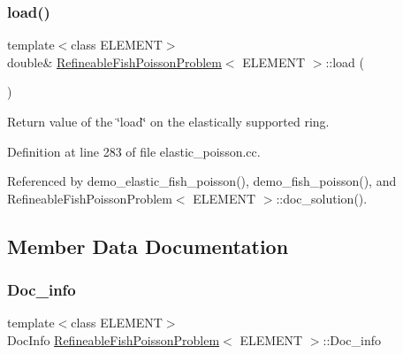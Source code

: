 \mbox{\label{classRefineableFishPoissonProblem_a20702e8945d442c9597348b550da14e4}} 
\subsubsection{\texorpdfstring{load()}{load()}}
{\footnotesize\ttfamily template$<$class E\+L\+E\+M\+E\+NT$>$ \\
double\& \hyperlink{classRefineableFishPoissonProblem}{Refineable\+Fish\+Poisson\+Problem}$<$ E\+L\+E\+M\+E\+NT $>$\+::load (\begin{DoxyParamCaption}{ }\end{DoxyParamCaption})\hspace{0.3cm}{\ttfamily [inline]}}



Return value of the \char`\"{}load\char`\"{} on the elastically supported ring. 



Definition at line 283 of file elastic\+\_\+poisson.\+cc.



Referenced by demo\+\_\+elastic\+\_\+fish\+\_\+poisson(), demo\+\_\+fish\+\_\+poisson(), and Refineable\+Fish\+Poisson\+Problem$<$ E\+L\+E\+M\+E\+N\+T $>$\+::doc\+\_\+solution().



\subsection{Member Data Documentation}
\mbox{\label{classRefineableFishPoissonProblem_ad6d382f1d38425323627f34e0559b28f}} 
\subsubsection{\texorpdfstring{Doc\+\_\+info}{Doc\_info}}
{\footnotesize\ttfamily template$<$class E\+L\+E\+M\+E\+NT$>$ \\
Doc\+Info \hyperlink{classRefineableFishPoissonProblem}{Refineable\+Fish\+Poisson\+Problem}$<$ E\+L\+E\+M\+E\+NT $>$\+::Doc\+\_\+info\hspace{0.3cm}{\ttfamily [private]}}



